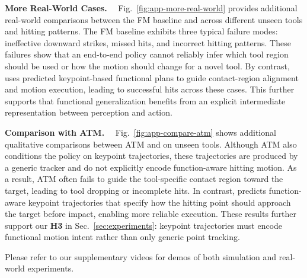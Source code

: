 \textbf{More Real-World Cases.}~~
Fig.~\ref{fig:app-more-real-world} provides additional real-world comparisons between the FM baseline and \algoname{} across different unseen tools and hitting patterns. The FM baseline exhibits three typical failure modes: ineffective downward strikes, missed hits, and incorrect hitting patterns. These failures show that an end-to-end policy cannot reliably infer which tool region should be used or how the motion should change for a novel tool. By contrast, \algoname{} uses predicted keypoint-based functional plans to guide contact-region alignment and motion execution, leading to successful hits across these cases. This further supports that functional generalization benefits from an explicit intermediate representation between perception and action. 

\textbf{Comparison with ATM.}~~
Fig.~\ref{fig:app-compare-atm} shows additional qualitative comparisons between ATM and \algoname{} on unseen tools. Although ATM also conditions the policy on keypoint trajectories, these trajectories are produced by a generic tracker and do not explicitly encode function-aware hitting motion. As a result, ATM often fails to guide the tool-specific contact region toward the target, leading to tool dropping or incomplete hits. In contrast, \algoname{} predicts function-aware keypoint trajectories that specify how the hitting point should approach the target before impact, enabling more reliable execution. These results further support our \textbf{H3} in Sec.~\ref{sec:experiments}: keypoint trajectories must encode functional motion intent rather than only generic point tracking.

Please refer to our supplementary videos for demos of both simulation and real-world experiments.





